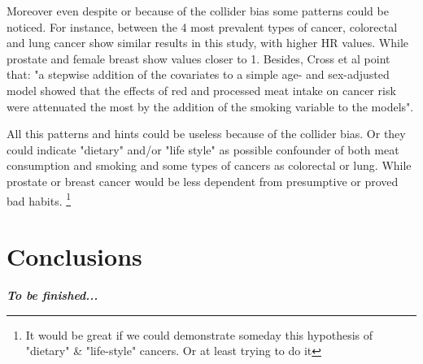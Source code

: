 \documentclass{article}
\begin{document}
Moreover even despite or because of the collider bias some patterns could be noticed. For instance, between the 4 most prevalent types of cancer, colorectal and lung cancer show similar results in this study, with higher HR values. While prostate and female breast show values closer to 1. Besides, Cross et al point that: "a stepwise addition of the covariates to a simple age- and sex-adjusted model showed that the effects of red and processed meat intake on cancer risk were attenuated the most by the addition of the smoking variable to the models". %

All this patterns and hints could be useless because of the collider bias. Or they could indicate "dietary" and/or "life style" as possible confounder of both meat consumption and smoking and some types of cancers as colorectal or lung. While prostate or breast cancer would be less dependent from presumptive or proved bad habits. \footnote{It would be great if we could demonstrate someday this hypothesis of "dietary" \& "life-style" cancers. Or at least trying to do it}


\section{Conclusions}

\textbf{\textit{To be finished...}}



\end{document}
